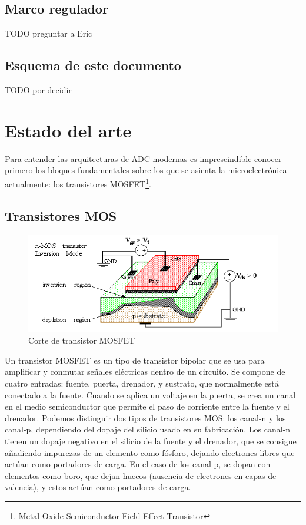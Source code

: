 \documentclass[12pt]{report} %
\begin{document}
	\section{Marco regulador}
	TODO	
	preguntar a Eric
	
	
	\section{Esquema de este documento}
	TODO
	por decidir
	

	
	

\chapter{Estado del arte}

	Para entender las arquitecturas de ADC modernas es imprescindible conocer primero los bloques fundamentales sobre los que se asienta la microelectrónica actualmente: los transistores MOSFET\footnote{Metal Oxide Semiconductor Field Effect Transistor}.
	
	\section{Transistores MOS}
	
	\begin{figure}[H]
		\includegraphics[width=\textwidth]{mos_transistor.png}
		\caption[Corte de transistor MOSFET]{Corte de transistor MOSFET\protect\footnotemark}
		\label{fig:mos_transistor.png}
	\end{figure}

	
	Un transistor MOSFET es un tipo de transistor bipolar que se usa para amplificar y conmutar señales eléctricas dentro de un circuito. Se compone de cuatro entradas: fuente, puerta, drenador, y sustrato, que normalmente está conectado a la fuente. Cuando se aplica un voltaje en la puerta, se crea un canal en el medio semiconductor que permite el paso de corriente entre la fuente y el drenador. Podemos distinguir dos tipos de transistores MOS: los canal-n y los canal-p, dependiendo del dopaje del silicio usado en su fabricación. Los canal-n tienen un dopaje negativo en el silicio de la fuente y el drenador, que se consigue añadiendo impurezas de un elemento como fósforo, dejando electrones libres que actúan como portadores de carga. En el caso de los canal-p, se dopan con elementos como boro, que dejan huecos (ausencia de electrones en capas de valencia), y estos actúan como portadores de carga.
	
\end{document}
